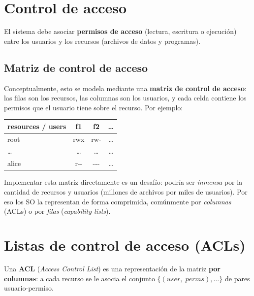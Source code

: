 \documentclass[11pt,a4paper]{article}
\begin{document}
\section{Control de acceso}

El sistema debe asociar \textbf{permisos de acceso} (lectura,
escritura o ejecución) entre los usuarios y los recursos (archivos de
datos y programas).

\subsection{Matriz de control de acceso}

Conceptualmente, esto se modela mediante una \textbf{matriz de control
de acceso}: las filas son los recursos, las columnas son los usuarios,
y cada celda contiene los permisos que el usuario tiene sobre el
recurso. Por ejemplo:

\begin{center}
\small
\begin{tabular}{@{}lccc@{}}
\toprule
\textbf{resources / users} & \textbf{f1} & \textbf{f2} & \textbf{\ldots} \\
\midrule
root  & rwx & rw- & \ldots \\
\ldots & \ldots & \ldots & \ldots \\
alice & r-{}- & -{}-{}- & \ldots \\
\bottomrule
\end{tabular}
\end{center}

\begin{importante}
Implementar esta matriz directamente es un desafío: podría ser
\emph{inmensa} por la cantidad de recursos y usuarios (millones de
archivos por miles de usuarios). Por eso los SO la representan de
forma comprimida, comúnmente por \emph{columnas} (ACLs) o por
\emph{filas} (\emph{capability lists}).
\end{importante}

\section{Listas de control de acceso (ACLs)}

Una \textbf{ACL} (\emph{Access Control List}) es una representación de
la matriz \textbf{por columnas}: a cada recurso se le asocia el
conjunto $\{(\textit{user},\;\textit{perms}), \ldots\}$ de pares
usuario-permiso.
\end{document}
